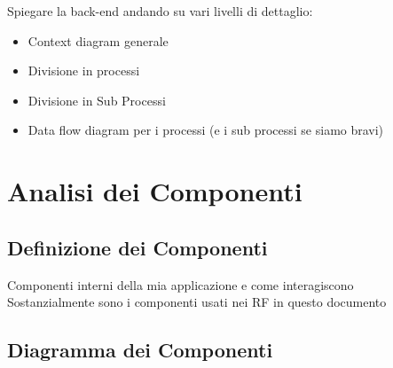 \documentclass{report}
\begin{document}
Spiegare la back-end andando su vari livelli di dettaglio:
\begin{itemize}
	\item Context diagram generale
	\item Divisione in processi
	\item Divisione in Sub Processi
	\item Data flow diagram per i processi (e i sub processi se siamo bravi)
\end{itemize}
\chapter{Analisi dei Componenti}

\section{Definizione dei Componenti}

Componenti interni della mia applicazione e come interagiscono\\
Sostanzialmente sono i componenti usati nei RF in questo documento

\section{Diagramma dei Componenti}
\end{document}
